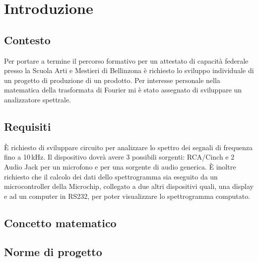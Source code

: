 \chapter{Introduzione}

\section{Contesto}
Per portare a termine il percorso formativo per un attestato di capacit\`a
federale presso la Scuola Arti e Mestieri di Bellinzona \`e richiesto lo
sviluppo individuale di un progetto di produzione di un prodotto.
Per interesse personale nella matematica della trasformata di Fourier mi \`e
stato assegnato di sviluppare un analizzatore spettrale.

\section{Requisiti}
\`E richiesto di sviluppare circuito per analizzare lo spettro dei segnali di
frequenza fino a 10\,kHz. Il dispositivo dovr\`a avere 3 possibili sorgenti:
RCA/Cinch e 2 Audio Jack per un microfono e per una sorgente di audio
generica. \`E inoltre richiesto che il calcolo dei dati dello spettrogramma
sia eseguito da un microcontroller della Microchip, collegato a due
altri dispositivi quali, una display e ad un computer in RS232, per poter
visualizzare lo spettrogramma computato.

\section{Concetto matematico}


\section{Norme di progetto}
